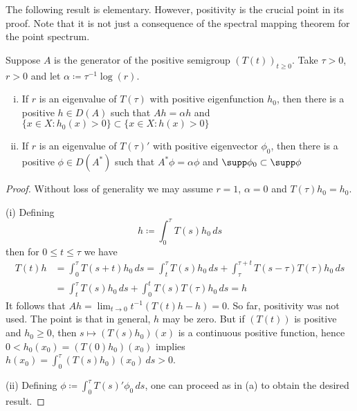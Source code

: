 The following result is elementary. However, positivity is the crucial point in its proof. 	
Note that it is not just a consequence of the spectral mapping theorem for the point spectrum.
\begin{proposition}\label{prop:b3-1.5}
Suppose $A$ is the generator of the positive semigroup $(T(t))_{t \geq 0}$.
Take $\tau > 0$, $r > 0$ and let $\alpha \coloneqq \tau^{-1}\log(r)$.
\begin{enumerate}[(i)]
\item 
If $r$ is an eigenvalue of $T(\tau)$ with positive eigenfunction $h_{0}$, then there is a positive $h \in D(A)$ such that $Ah = \alpha h$ and $\{x \in X \colon h_{0}(x) > 0\} \subset \{x \in X \colon h(x) > 0\}$
		
\item 
If $r$ is an eigenvalue of $T(\tau)'$ with positive eigenvector $\phi_{0}$, then there is a positive $\phi \in D(A^*)$ such that $A^*\phi = \alpha\phi$ and $\supp\phi_{0} \subset \supp\phi$
	\end{enumerate}
\end{proposition}
%	
\begin{proof}
	Without loss of generality we may assume $r = 1$, \ie $\alpha = 0$ and $T(\tau)h_{0} = h_{0}$.

(i)	Defining
	\begin{equation}\label{eq:b3-1.14}
		h \coloneqq \int_{0}^{\tau} T(s)h_{0} \, ds
	\end{equation}
	then for $0 \leq t \leq \tau$ we have
	\begin{align*}
		T(t)h &= \int_{0}^{\tau} T(s+t)h_{0} \, ds = \int_{t}^{\tau} T(s)h_{0} \, ds + \int_{\tau}^{\tau+t} T(s-\tau)T(\tau)h_{0} \, ds \\
		&= \int_{t}^{\tau} T(s)h_{0} \, ds + \int_{0}^{t} T(s)T(\tau)h_{0} \, ds = h
	\end{align*}
	It follows that $Ah = \lim_{t \to 0} t^{-1}(T(t)h - h) = 0$.
	So far, positivity was not used. The point is that in general, $h$ may be zero.
	But if $(T(t))$ is positive and $h_{0} \geq 0$, then $s \mapsto (T(s)h_{0})(x)$ is a continuous positive function, hence $0 < h_{0}(x_{0}) = (T(0)h_{0})(x_{0})$ implies $h(x_{0}) = \int_{0}^{\tau} (T(s)h_{0})(x_{0}) \, ds > 0$.
	
(ii)	Defining $\phi \coloneqq \int_{0}^{\tau} T(s)'\phi_{0} \, ds$, one can proceed as in (a) to obtain the desired result.
\end{proof}
